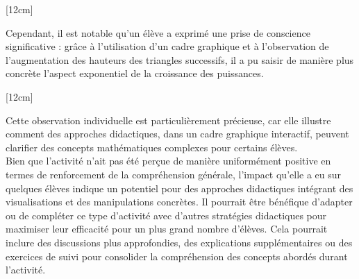 [12cm]

Cependant,
il est notable qu'un élève a exprimé une prise de conscience significative :
grâce à l'utilisation d'un cadre graphique et à l'observation de l'augmentation des hauteurs des triangles successifs,
il a pu saisir de manière plus concrète l'aspect exponentiel de la croissance des puissances.

[12cm]

Cette observation individuelle est particulièrement précieuse,
car elle illustre comment des approches didactiques,
dans un cadre graphique interactif,
peuvent clarifier des concepts mathématiques complexes pour certains élèves.\\

Bien que l'activité n'ait pas été perçue de manière uniformément positive en termes de renforcement de la compréhension générale,
l'impact qu'elle a eu sur quelques élèves indique un potentiel pour des approches didactiques intégrant des visualisations et des manipulations concrètes.
Il pourrait être bénéfique d'adapter ou de compléter ce type d'activité avec d'autres stratégies didactiques pour maximiser leur efficacité pour un plus grand nombre d'élèves.
Cela pourrait inclure des discussions plus approfondies,
des explications supplémentaires ou des exercices de suivi pour consolider la compréhension des concepts abordés durant l'activité.